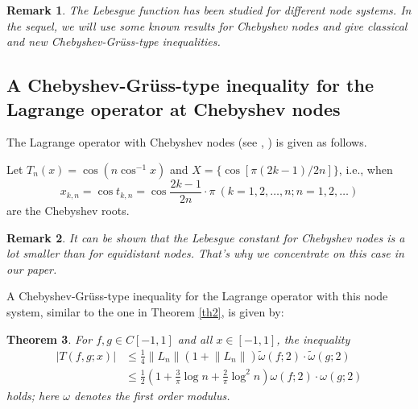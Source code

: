 \documentclass[12pt,leqno,a4paper,dvips,twoside]{article}
\newtheorem{thm}{Theorem}[section]
\newtheorem{rema}[thm]{Remark}%
\begin{document}
{\begin{rema}
	The Lebesgue function has been studied for different node systems. In the sequel, we will use
	some known results for Chebyshev nodes and give classical and new Chebyshev-Gr\"{u}ss-type inequalities. 
\end{rema}

\subsection{A Chebyshev-Gr\"{u}ss-type inequality for the Lagrange operator at Chebyshev nodes}

The Lagrange operator with Chebyshev nodes (see \cite{brutman:1997}, \cite{chelight:2000}) is given as follows. 

Let $T_n(x)=\cos(n\cos^{-1}x)$ and $X=\{\cos[\pi(2k-1)/2n]\}$, i.e., when 
	\begin{equation*}
		x_{k,n}=\cos t_{k,n}=\cos \frac{2k-1}{2n}\cdot \pi\ (k=1,2,\ldots,n; n=1,2,\ldots)
	\end{equation*} 
are the Chebyshev roots. 

\begin{rema}
It can be shown that the Lebesgue constant for Chebyshev nodes is a lot smaller than for equidistant nodes. That's why we concentrate on this case in our paper. 
\end{rema}

A Chebyshev-Gr\"{u}ss-type inequality for the Lagrange operator with this node system, similar to the one in Theorem \ref{th2}, is given by:

\begin{thm}
	For $f,g\in C[-1,1]$ and all $x\in [-1,1]$, the inequality
		\begin{align*}
			\left| T(f,g;x)\right|
&\leq \frac{1}{4}\left\|L_n\right\|(1+\left\|L_n\right\|)\widetilde{\omega}\left(f;2\right)\cdot \widetilde{\omega}\left(g;2\right)\\
&\leq \frac{1}{2}\left(1+\frac{3}{\pi}\log n+\frac{2}{\pi}\log^2 n\right)\omega(f;2)\cdot \omega(g;2)
		\end{align*}
holds; here $\omega$ denotes the first order modulus. 
\end{thm}

}
\end{document}
